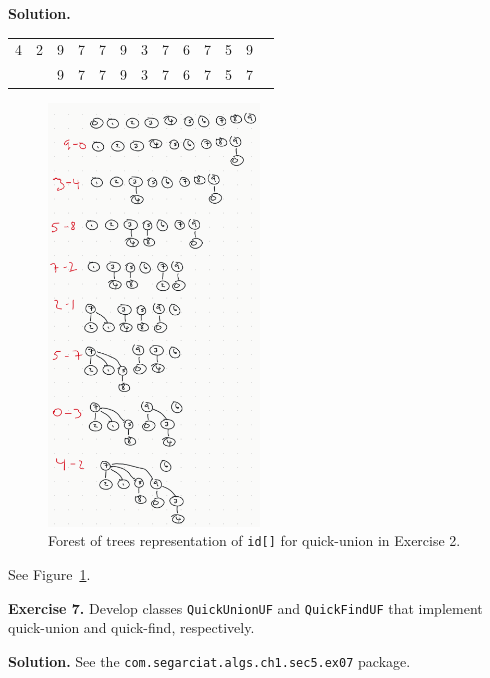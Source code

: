 \documentclass[12pt, a4paper]{article}
\newenvironment{ex}[2][Exercise]
{\par\medskip\noindent \textbf{#1 #2.}}
{\medskip}
\newenvironment{sol}[1][Solution]
{\par\medskip\noindent \textbf{#1.} }
{\medskip}
\begin{document}
\begin{sol}
\begin{center}
\begin{tabular}{cc|cccccccccc|c}
				4  & 2  & {\color{green}9} & {\color{green}7} & {\color{green}7} & {\color{green}9} & {\color{green}3} & {\color{green}7} & 6 & {\color{green}7} & {\color{green}5} & {\color{green}9} & {}\\
				{} & {} & 9 & 7 & 7 & 9 & 3 & 7 & 6 & 7 & 5 & {\color{red}7} & {}\\
			\end{tabular}
		\end{center}
		\begin{figure}
			\centering
			\includegraphics[width=0.5\textwidth]{exercise-03-weighted-quick-union-forest-of-trees}
			\caption{Forest of trees representation of \texttt{id[]} for quick-union in Exercise 2.}
			\label{ex-03}
		\end{figure}
		See Figure~\ref{ex-03}.
	\end{sol}
	\begin{ex}{7}
		Develop classes \texttt{QuickUnionUF} and \texttt{QuickFindUF} that implement quick-union
		and quick-find, respectively.
	\end{ex}
	\begin{sol}
		See the \texttt{com.segarciat.algs.ch1.sec5.ex07} package.
	\end{sol}
	\pagebreak
	\printbibliography
\end{document}
